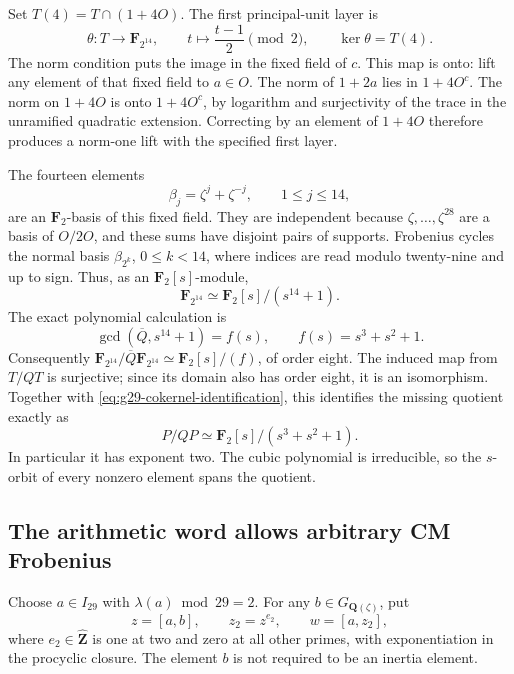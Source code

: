 Set \(T(4)=T\cap(1+4O)\). The first principal-unit layer is
\[
 \theta:T\longrightarrow \mathbf F_{2^{14}},\qquad
             t\longmapsto\frac{t-1}{2}\pmod2,
 \qquad \ker\theta=T(4).
\]
The norm condition puts the image in the fixed field of \(c\).
This map is onto: lift any element of that fixed field to \(a\in O\).
The norm of \(1+2a\) lies in \(1+4O^c\). The norm on
\(1+4O\) is onto \(1+4O^c\), by logarithm and surjectivity
of the trace in the unramified quadratic extension. Correcting by
an element of \(1+4O\) therefore produces a norm-one lift with
the specified first layer.

The fourteen elements
\[
                   \beta_j=\zeta^j+\zeta^{-j},\qquad 1\le j\le14,
\]
are an \(\mathbf F_2\)-basis of this fixed field. They are independent
because \(\zeta,\ldots,\zeta^{28}\) are a basis of
\(O/2O\), and these sums have disjoint pairs of supports.
Frobenius cycles the normal basis \(\beta_{2^k}\), \(0\le k<14\),
where indices are read modulo twenty-nine and up to sign. Thus, as an
\(\mathbf F_2[s]\)-module,
\[
                    \mathbf F_{2^{14}}\simeq
                         \mathbf F_2[s]/(s^{14}+1).
\]
The exact polynomial calculation is
\[
 \gcd(\overline Q,s^{14}+1)=f(s),\qquad f(s)=s^3+s^2+1.
\]
Consequently
\(\mathbf F_{2^{14}}/\overline Q\mathbf F_{2^{14}}
\simeq\mathbf F_2[s]/(f)\), of order eight.
The induced map from \(T/QT\) is surjective; since its domain also
has order eight, it is an isomorphism. Together with
\eqref{eq:g29-cokernel-identification}, this identifies the missing
quotient exactly as
\begin{equation}\label{eq:g29-layer-certificate}
                         P/QP\simeq\mathbf F_2[s]/(s^3+s^2+1).
\end{equation}
In particular it has exponent two. The cubic polynomial is irreducible,
so the \(s\)-orbit of every nonzero element spans the quotient.

\subsection{The arithmetic word allows arbitrary CM Frobenius}

Choose \(a\in I_{29}\) with \(\lambda(a)\bmod29=2\).
For any \(b\in G_{\mathbf Q(\zeta)}\), put
\[
                       z=[a,b],\qquad z_2=z^{e_2},\qquad w=[a,z_2],
\]
where \(e_2\in\widehat{\mathbf Z}\) is one at two and zero at
all other primes, with exponentiation in the procyclic closure.
The element \(b\) is not required to be an inertia element.


